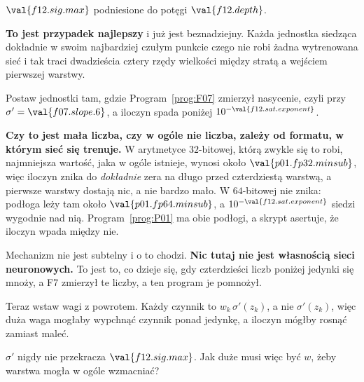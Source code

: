 \begin{fr}
$\val{f12.sig.max}$ podniesione do potęgi $\val{f12.depth}$.

\begin{trapbox}
\textbf{To jest przypadek najlepszy} i już jest beznadziejny. Każda jednostka
siedząca dokładnie w swoim najbardziej czułym punkcie \dash{} czego nie robi
żadna wytrenowana sieć \dash{} i tak traci dwadzieścia cztery rzędy wielkości
między stratą a wejściem pierwszej warstwy.

Postaw jednostki tam, gdzie Program~\ref{prog:F07} zmierzył nasycenie, czyli
przy $\sigma' = \val{f07.slope.6}$, a iloczyn spada poniżej
$10^{-\val{f12.sat.exponent}}$.

\textbf{Czy to jest mała liczba, czy w ogóle nie liczba, zależy od formatu, w
którym sieć się trenuje.} W arytmetyce $32$-bitowej, którą zwykle się to robi,
najmniejsza wartość, jaka w ogóle istnieje, wynosi około
$\val{p01.fp32.minsub}$, więc iloczyn znika do \emph{dokładnie} zera na długo
przed czterdziestą warstwą, a pierwsze warstwy dostają nic, a nie bardzo mało.
W $64$-bitowej nie znika: podłoga leży tam około $\val{p01.fp64.minsub}$, a
$10^{-\val{f12.sat.exponent}}$ siedzi wygodnie nad nią. Program~\ref{prog:P01}
ma obie podłogi, a skrypt asertuje, że iloczyn wpada między nie.

Mechanizm nie jest subtelny i o to chodzi. \textbf{Nic tutaj nie jest
własnością sieci neuronowych.} To jest to, co dzieje się, gdy czterdzieści
liczb poniżej jedynki się mnoży, a F7 zmierzył te liczby, a ten program je
pomnożył.
\end{trapbox}

\end{fr}

\begin{fr}
Teraz wstaw wagi z powrotem. Każdy czynnik to $w_k\,\sigma'(z_k)$, a nie
$\sigma'(z_k)$, więc duża waga mogłaby wypchnąć czynnik ponad jedynkę, a
iloczyn mógłby rosnąć zamiast maleć.

$\sigma'$ nigdy nie przekracza $\val{f12.sig.max}$. Jak duże musi więc być
$w$, żeby warstwa mogła w ogóle wzmacniać?
\dotline
\nextframe
\end{fr}

